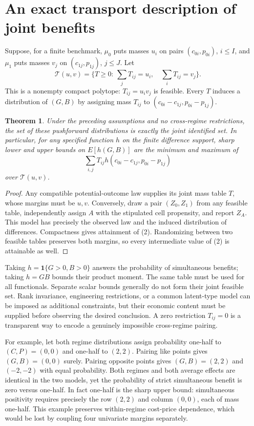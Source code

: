 \documentclass[11pt,a4paper]{article}
\newtheorem{theorem}{Theorem}[section]
\begin{document}
\section{An exact transport description of joint benefits}
Suppose, for a finite benchmark, $\mu_0$ puts masses $u_i$ on pairs $(c_{0i},p_{0i})$, $i\le I$, and $\mu_1$ puts masses $v_j$ on $(c_{1j},p_{1j})$, $j\le J$. Let
\[
 \mathcal T(u,v)=\{T\ge0:\ \sum_jT_{ij}=u_i,\quad\sum_iT_{ij}=v_j\}.
\]
This is a nonempty compact polytope: $T_{ij}=u_iv_j$ is feasible. Every $T$ induces a distribution of $(G,B)$ by assigning mass $T_{ij}$ to
$(c_{0i}-c_{1j},p_{0i}-p_{1j})$.
\begin{theorem}
Under the preceding assumptions and no cross-regime restrictions, the set of these pushforward distributions is exactly the joint identified set. In particular, for any specified function $h$ on the finite difference support, sharp lower and upper bounds on $E[h(G,B)]$ are the minimum and maximum of
\[
 \sum_{i,j}T_{ij}h(c_{0i}-c_{1j},p_{0i}-p_{1j}) \tag{2}
\]
over $\mathcal T(u,v)$.
\end{theorem}
\begin{proof}
Any compatible potential-outcome law supplies its joint mass table $T$, whose margins must be $u,v$. Conversely, draw a pair $(Z_0,Z_1)$ from any feasible table, independently assign $A$ with the stipulated cell propensity, and report $Z_A$. This model has precisely the observed law and the induced distribution of differences. Compactness gives attainment of (2). Randomizing between two feasible tables preserves both margins, so every intermediate value of (2) is attainable as well.
\end{proof}
Taking $h=\mathbf1\{G>0,B>0\}$ answers the probability of simultaneous benefits; taking $h=GB$ bounds their product moment. The same table must be used for all functionals. Separate scalar bounds generally do not form their joint feasible set. Rank invariance, engineering restrictions, or a common latent-type model can be imposed as additional constraints, but their economic content must be supplied before observing the desired conclusion. A zero restriction $T_{ij}=0$ is a transparent way to encode a genuinely impossible cross-regime pairing.

For example, let both regime distributions assign probability one-half to $(C,P)=(0,0)$ and one-half to $(2,2)$. Pairing like points gives $(G,B)=(0,0)$ surely. Pairing opposite points gives $(G,B)=(2,2)$ and $(-2,-2)$ with equal probability. Both regimes and both average effects are identical in the two models, yet the probability of strict simultaneous benefit is zero versus one-half. In fact one-half is the sharp upper bound: simultaneous positivity requires precisely the row $(2,2)$ and column $(0,0)$, each of mass one-half. This example preserves within-regime cost-price dependence, which would be lost by coupling four univariate margins separately.
\end{document}
